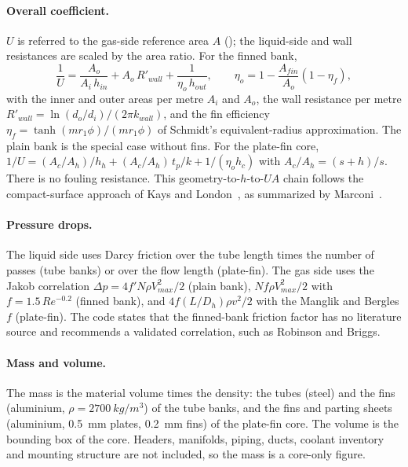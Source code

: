 \documentclass[a4paper,11pt]{article}
\begin{document}
\paragraph{Overall coefficient.} $U$ is referred to the gas-side reference area $A$
(); the liquid-side and wall resistances are scaled by the area ratio.
For the finned bank,
\begin{equation}
  \frac{1}{U} = \frac{A_o}{A_i\,h_{in}} + A_o\,R'_{wall} + \frac{1}{\eta_o\,h_{out}},
  \qquad \eta_o = 1 - \frac{A_{fin}}{A_o}(1 - \eta_f),
\end{equation}
with the inner and outer areas per metre $A_i$ and $A_o$, the wall resistance per metre
$R'_{wall} = \ln(d_o/d_i)/(2\pi k_{wall})$, and the fin efficiency $\eta_f =
\tanh(mr_1\phi)/(mr_1\phi)$ of Schmidt's equivalent-radius approximation. The plain bank is
the special case without fins. For the plate-fin core,
$1/U = (A_c/A_h)/h_h + (A_c/A_h)\,t_p/k + 1/(\eta_o h_c)$ with $A_c/A_h = (s+h)/s$. There
is no fouling resistance. This geometry-to-$h$-to-$UA$ chain follows the compact-surface
approach of Kays and London~\cite{kays}, as summarized by Marconi~\cite{marconi2026}.

\paragraph{Pressure drops.} The liquid side uses Darcy friction over the tube length times
the number of passes (tube banks) or over the flow length (plate-fin). The gas side uses
the Jakob correlation $\Delta p = 4f'N\rho V_{max}^2/2$ (plain bank), $N f \rho V_{max}^2/2$
with $f = 1.5\,Re^{-0.2}$ (finned bank), and $4f(L/D_h)\rho v^2/2$ with the Manglik and
Bergles $f$ (plate-fin). The code states that the finned-bank friction factor has no
literature source and recommends a validated correlation, such as Robinson and Briggs.

\paragraph{Mass and volume.} The mass is the material volume times the density: the
tubes (steel) and the fins (aluminium, $\rho = \SI{2700}{kg/m^3}$) of the tube banks, and
the fins and parting sheets (aluminium, \SI{0.5}{mm} plates, \SI{0.2}{mm} fins) of the
plate-fin core. The volume is the bounding box of the core. Headers, manifolds, piping,
ducts, coolant inventory and mounting structure are not included, so the mass is a
core-only figure.
\end{document}
